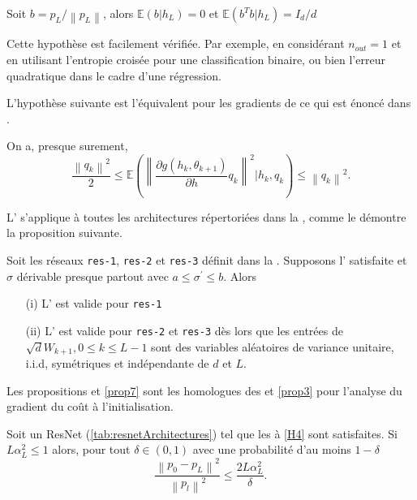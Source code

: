 \begin{assumption}\label{H3}
    Soit $ b= p_L / \left\| p_L \right\|  $, alors $ \mathbb{E}(b | h_L) = 0 $ et $ \mathbb{E}(b^T b | h_L) = I_d / d $
\end{assumption}
\begin{note}
    Cette hypothèse est facilement vérifiée. Par exemple, en considérant $n_{out} = 1$ et en utilisant l'entropie croisée pour une classification binaire, ou bien l'erreur quadratique dans le cadre d'une régression.
\end{note}
L'hypothèse suivante est l'équivalent pour les gradients de ce qui est énoncé dans .
\begin{assumption}\label{H4}
    On a, presque surement, 
    \[
        \frac{\left\| q_k \right\| ^2}{2} \leqslant \mathbb{E}\left(\left\| \frac{\partial g(h_k, \theta _{k+1})}{\partial h} q_k  \right\| ^2 | h_k, q_k \right) \leqslant \left\| q_k \right\| ^2
    .\]
\end{assumption}
L' s'applique à toutes les architectures répertoriées dans la , comme le démontre la proposition suivante.
\begin{proposition}\label{prop5}
    Soit les réseaux \texttt{res-1}, \texttt{res-2} et \texttt{res-3} définit dans la . Supposons l' satisfaite et $ \sigma  $ dérivable presque partout avec $ a \leqslant \sigma ^\prime \leqslant b $. Alors
    \begin{itemize}
        \item [(i)] L' est valide pour \texttt{res-1}
        \item [(ii)] L' est valide pour \texttt{res-2} et \texttt{res-3} dès lors que les entrées de $ \sqrt{d} W_{k+1}, 0 \leqslant k \leqslant L-1 $ sont des variables aléatoires de variance unitaire, i.i.d, symétriques et indépendante de $ d $ et $ L $.
    \end{itemize}
\end{proposition}
Les propositions  et \ref{prop7} sont les homologues des  et \ref{prop3} pour l'analyse du gradient du coût à l'initialisation.
\begin{proposition}\label{prop6}
    Soit un ResNet (\ref{tab:resnetArchitectures}) tel que les  à \ref{H4} sont satisfaites. Si $ L \alpha _L ^2 \leqslant 1 $ alors, pour tout $ \delta \in (0,1) $ avec une probabilité d'au moins $ 1 - \delta  $ 
    \[
        \frac{\left\| p_0 - p_L \right\| ^2 }{\left\| p_l \right\| ^2 } \leqslant \frac{2 L \alpha _L ^2}{\delta }
    .\]
\end{proposition}

